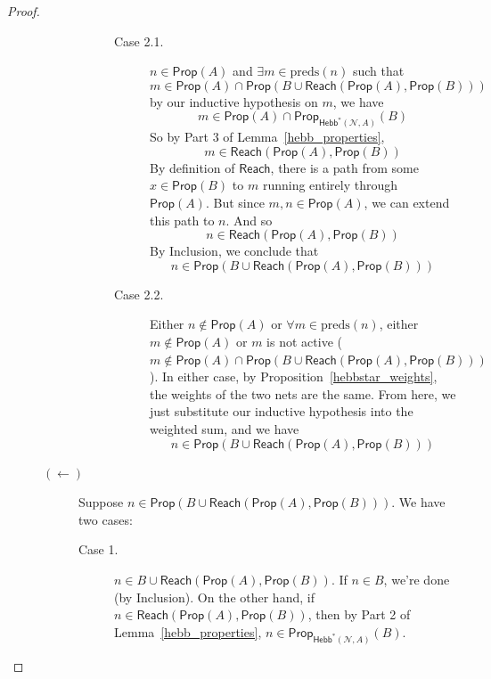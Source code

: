 \documentclass[letterpaper]{article}
\theoremstyle{definition}
\newcommand{\preds}[1]{\mbox{preds}(#1)}
\newcommand{\Net}{\mathcal{N}}
\newcommand{\Prop}{\textsf{Prop}}
\newcommand{\Reach}{\textsf{Reach}}
\newcommand{\Hebbstar}[2]{\textsf{Hebb}^*(#1, #2)}
\begin{document}
\begin{proof}
\begin{description}
\begin{description}
\begin{description}
                \begin{description}
                    \item[Case 2.1.] $n \in \Prop(A)$ and $\exists m \in \preds{n}$ such that
                    \[ 
                        m \in \Prop(A) \cap \Prop(B \cup \Reach(\Prop(A), \Prop(B))) 
                    \]
                    by our inductive hypothesis on $m$, we have
                    \[
                        m \in \Prop(A) \cap \Prop_{\Hebbstar{\Net}{A}}(B)
                    \]
                    So by Part 3 of Lemma~\ref{hebb_properties},
                    \[
                        m \in \Reach(\Prop(A), \Prop(B))
                    \]
                    By definition of $\Reach$, there is a path from some $x \in \Prop(B)$ to $m$ running entirely through $\Prop(A)$.  But since $m, n \in \Prop(A)$, we can extend this path to $n$.  And so
                    \[
                        n \in \Reach(\Prop(A), \Prop(B))
                    \]
                    By Inclusion, we conclude that
                    \[
                        n \in \Prop(B \cup \Reach(\Prop(A), \Prop(B)))
                    \]

                    \item[Case 2.2.] Either $n \not \in \Prop(A)$ or $\forall m \in \preds{n}$, either $m \not \in \Prop(A)$ or $m$ is not active ($m \not \in \Prop(A) \cap \Prop(B \cup \Reach(\Prop(A), \Prop(B)))$).  In either case, by Proposition~\ref{hebbstar_weights}, the weights of the two nets are the same.  From here, we just substitute our inductive hypothesis into the weighted sum, and we have
                    \[
                        n \in \Prop(B \cup \Reach(\Prop(A), \Prop(B)))
                    \]
                \end{description}
            \end{description}
    
            \item[$(\leftarrow)$] Suppose $n \in \Prop(B \cup \Reach(\Prop(A), \Prop(B)))$.  We have two cases:
            \begin{description}
                \item[Case 1.] $n \in B \cup \Reach(\Prop(A), \Prop(B))$.  If $n \in B$, we're done (by Inclusion).  On the other hand, if $n \in \Reach(\Prop(A), \Prop(B))$, then by Part 2 of Lemma~\ref{hebb_properties}, $n \in \Prop_{\Hebbstar{\Net}{A}}(B)$.
                

\end{description}
\end{description}
\end{description}
\end{proof}
\end{document}
